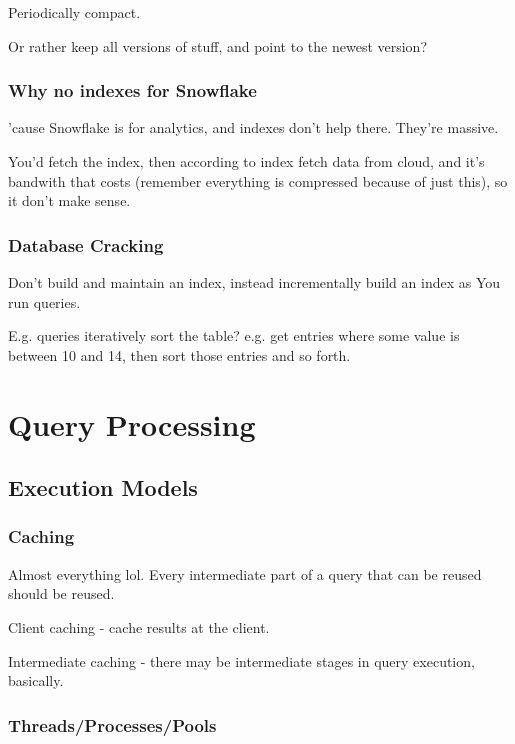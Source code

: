 \documentclass{article}
\begin{document}
				Periodically compact.
				
				Or rather keep all versions of stuff, and point to the newest version?
				
			\subsubsection{Why no indexes for Snowflake}
			
				'cause Snowflake is for analytics, and indexes don't help there. They're massive.
				
				You'd fetch the index, then according to index fetch data from cloud, and it's bandwith that costs (remember everything is compressed because of just this), so it don't make sense.
				
			\subsubsection{Database Cracking}
			
				Don't build and maintain an index, instead incrementally build an index as You run queries.
				
				E.g. queries iteratively sort the table? e.g. get entries where some value is between 10 and 14, then sort those entries and so forth.
				
\newpage
\section{Query Processing}

	\subsection{Execution Models}
	
		\subsubsection{Caching}
		
			Almost everything lol. Every intermediate part of a query that can be reused should be reused.
			
			Client caching - cache results at the client.
			
			Intermediate caching - there may be intermediate stages in query execution, basically.
			
		\subsubsection{Threads/Processes/Pools}
		
\end{document}
